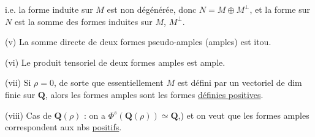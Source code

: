 i.e. la forme induite sur $M$ 
est non dégénérée,
donc $N=M\oplus M^\perp$, et la forme sur
$N$ est la somme des formes induites sur
$M$, $M^\perp$.

(v) La somme directe de deux formes
 pseudo-amples (amples) est
itou.

(vi) Le produit tensoriel de deux formes
amples est ample.

(vii) Si $\rho=0$, de sorte que essentiellement $M$
est défini par un vectoriel de dim
finie sur $\mathbf Q$, alors les formes amples
sont les formes \uline{définies positives}.

(viii) Cas de $\mathbf Q(\rho)$ : on a $\Phi^s(\mathbf Q(\rho))\simeq\mathbf Q$,)
et on veut que les formes amples
correspondent aux nbs  \uline{positifs}.
